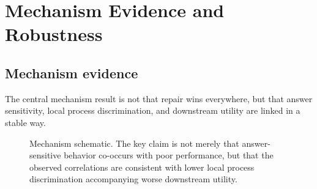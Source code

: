\section{Mechanism Evidence and Robustness}

\subsection{Mechanism evidence}

The central mechanism result is not that repair wins everywhere, but that
answer sensitivity, local process discrimination, and downstream utility are
linked in a stable way.

\begin{figure}[t]
\centering
\setlength{\fboxsep}{10pt}
\caption{Mechanism schematic. The key claim is not merely that
answer-sensitive behavior co-occurs with poor performance, but that the
observed correlations are consistent with lower local process discrimination
accompanying worse downstream utility.}
\label{fig:mechanism_chain}
\end{figure}

